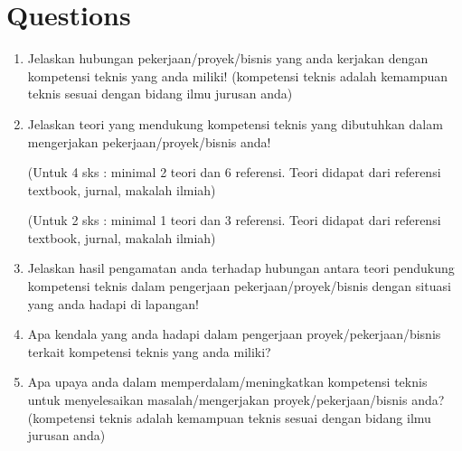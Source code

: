 \documentclass[12pt, letterpaper]{article}
\begin{document}
\section*{Questions}
\begin{enumerate}
    \item Jelaskan hubungan pekerjaan/proyek/bisnis yang anda kerjakan dengan kompetensi teknis yang anda miliki! (kompetensi teknis adalah kemampuan teknis sesuai dengan bidang ilmu jurusan anda)
    \item Jelaskan teori yang mendukung kompetensi teknis yang dibutuhkan dalam mengerjakan pekerjaan/proyek/bisnis anda!

        (Untuk 4 sks : minimal 2 teori dan 6 referensi. Teori didapat dari referensi textbook, jurnal, makalah ilmiah)

        (Untuk 2 sks : minimal 1 teori dan 3 referensi. Teori didapat dari referensi textbook, jurnal, makalah ilmiah)
    \item Jelaskan hasil pengamatan anda terhadap hubungan antara teori pendukung kompetensi teknis dalam pengerjaan pekerjaan/proyek/bisnis dengan situasi yang anda hadapi di lapangan!
    \item Apa kendala yang anda hadapi dalam pengerjaan proyek/pekerjaan/bisnis terkait kompetensi teknis yang anda miliki?
    \item Apa upaya anda dalam memperdalam/meningkatkan kompetensi teknis untuk menyelesaikan  masalah/mengerjakan proyek/pekerjaan/bisnis anda? (kompetensi teknis adalah kemampuan teknis sesuai dengan bidang ilmu jurusan anda)
\end{enumerate}
\end{document}
